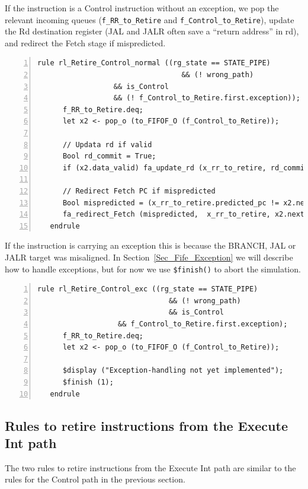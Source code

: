 If the instruction is a Control instruction without an exception, we
pop the relevant incoming queues (\verb|f_RR_to_Retire| and
\verb|f_Control_to_Retire|), update the Rd destination register (JAL
and JALR often save a ``return address'' in rd), and redirect the
Fetch stage if mispredicted.

{\small
\begin{Verbatim}[frame=single, numbers=left, label=(In file:src\_Fife/S5\_Retire.bsv)]
   rule rl_Retire_Control_normal ((rg_state == STATE_PIPE)
                                  && (! wrong_path)
				  && is_Control
				  && (! f_Control_to_Retire.first.exception));
      f_RR_to_Retire.deq;
      let x2 <- pop_o (to_FIFOF_O (f_Control_to_Retire));

      // Updata rd if valid
      Bool rd_commit = True;
      if (x2.data_valid) fa_update_rd (x_rr_to_retire, rd_commit, x2.data);

      // Redirect Fetch PC if mispredicted
      Bool mispredicted = (x_rr_to_retire.predicted_pc != x2.next_pc);
      fa_redirect_Fetch (mispredicted,  x_rr_to_retire, x2.next_pc);
   endrule
\end{Verbatim}
}

If the instruction is carrying an exception this is because the
BRANCH, JAL or JALR target was misaligned.  In
Section~\ref{Sec_Fife_Exception} we will describe how to handle
exceptions, but for now we use \verb|$finish()| to abort the
simulation.

{\small
\begin{Verbatim}[frame=single, numbers=left, label=(In file:src\_Fife/S5\_Retire.bsv)]
   rule rl_Retire_Control_exc ((rg_state == STATE_PIPE)
                               && (! wrong_path)
                               && is_Control
			       && f_Control_to_Retire.first.exception);
      f_RR_to_Retire.deq;
      let x2 <- pop_o (to_FIFOF_O (f_Control_to_Retire));

      $display ("Exception-handling not yet implemented");
      $finish (1);
   endrule
\end{Verbatim}
}


\subsection{Rules to retire instructions from the Execute Int path}

The two rules to retire instructions from the Execute Int path are
similar to the rules for the Control path in the previous section.

